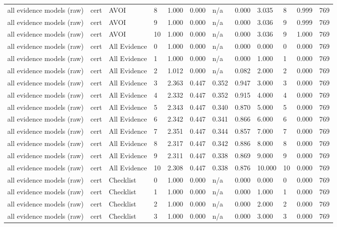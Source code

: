 \begin{table}[!ht]
{\begin{tabular}{llllllllllll}
all evidence models (raw) & cert & AVOI & 8 & 1.000 & 0.000 & n/a & 0.000 & 3.035 & 8 & 0.999 & 769 \\
all evidence models (raw) & cert & AVOI & 9 & 1.000 & 0.000 & n/a & 0.000 & 3.036 & 9 & 0.999 & 769 \\
all evidence models (raw) & cert & AVOI & 10 & 1.000 & 0.000 & n/a & 0.000 & 3.036 & 9 & 1.000 & 769 \\
all evidence models (raw) & cert & All Evidence & 0 & 1.000 & 0.000 & n/a & 0.000 & 0.000 & 0 & 0.000 & 769 \\
all evidence models (raw) & cert & All Evidence & 1 & 1.000 & 0.000 & n/a & 0.000 & 1.000 & 1 & 0.000 & 769 \\
all evidence models (raw) & cert & All Evidence & 2 & 1.012 & 0.000 & n/a & 0.082 & 2.000 & 2 & 0.000 & 769 \\
all evidence models (raw) & cert & All Evidence & 3 & 2.363 & 0.447 & 0.352 & 0.947 & 3.000 & 3 & 0.000 & 769 \\
all evidence models (raw) & cert & All Evidence & 4 & 2.332 & 0.447 & 0.352 & 0.915 & 4.000 & 4 & 0.000 & 769 \\
all evidence models (raw) & cert & All Evidence & 5 & 2.343 & 0.447 & 0.340 & 0.870 & 5.000 & 5 & 0.000 & 769 \\
all evidence models (raw) & cert & All Evidence & 6 & 2.342 & 0.447 & 0.341 & 0.866 & 6.000 & 6 & 0.000 & 769 \\
all evidence models (raw) & cert & All Evidence & 7 & 2.351 & 0.447 & 0.344 & 0.857 & 7.000 & 7 & 0.000 & 769 \\
all evidence models (raw) & cert & All Evidence & 8 & 2.317 & 0.447 & 0.342 & 0.886 & 8.000 & 8 & 0.000 & 769 \\
all evidence models (raw) & cert & All Evidence & 9 & 2.311 & 0.447 & 0.338 & 0.869 & 9.000 & 9 & 0.000 & 769 \\
all evidence models (raw) & cert & All Evidence & 10 & 2.308 & 0.447 & 0.338 & 0.876 & 10.000 & 10 & 0.000 & 769 \\
all evidence models (raw) & cert & Checklist & 0 & 1.000 & 0.000 & n/a & 0.000 & 0.000 & 0 & 0.000 & 769 \\
all evidence models (raw) & cert & Checklist & 1 & 1.000 & 0.000 & n/a & 0.000 & 1.000 & 1 & 0.000 & 769 \\
all evidence models (raw) & cert & Checklist & 2 & 1.000 & 0.000 & n/a & 0.000 & 2.000 & 2 & 0.000 & 769 \\
all evidence models (raw) & cert & Checklist & 3 & 1.000 & 0.000 & n/a & 0.000 & 3.000 & 3 & 0.000 & 769 \\

\end{tabular}}
\end{table}
